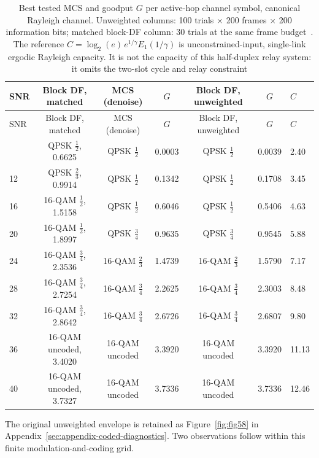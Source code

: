 \begingroup\footnotesize
\begin{longtable}[]{@{}lcccccl@{}}
\caption[Link-adaptation envelope: best MCS per SNR]{Best tested MCS and goodput $G$ per active-hop channel symbol, canonical Rayleigh channel. Unweighted columns: 100 trials $\times$ 200 frames $\times$ 200 information bits; matched block-DF column: 30 trials at the same frame budget~. The reference $C=\log_2(e)\,e^{1/\gamma}E_1(1/\gamma)$ is unconstrained-input, single-link ergodic Rayleigh capacity. It is not the capacity of this half-duplex relay system: it omits the two-slot cycle and relay constraint}\label{tbl:table42}\tabularnewline
\toprule\noalign{}
SNR & Block DF, matched & MCS (denoise) & $G$ & Block DF, unweighted & $G$ & $C$ \\
\midrule\noalign{}
\endfirsthead
\toprule\noalign{}
SNR & Block DF, matched & MCS (denoise) & $G$ & Block DF, unweighted & $G$ & $C$ \\
\midrule\noalign{}
\endhead
\bottomrule\noalign{}
\endlastfoot
8 & QPSK $\frac{1}{2}$, 0.6625 & QPSK $\frac{1}{2}$ & 0.0003 & QPSK $\frac{1}{2}$ & 0.0039 & 2.40 \\
12 & QPSK $\frac{2}{3}$, 0.9914 & QPSK $\frac{1}{2}$ & 0.1342 & QPSK $\frac{1}{2}$ & 0.1708 & 3.45 \\
16 & 16-QAM $\frac{1}{2}$, 1.5158 & QPSK $\frac{1}{2}$ & 0.6046 & QPSK $\frac{1}{2}$ & 0.5406 & 4.63 \\
20 & 16-QAM $\frac{1}{2}$, 1.8997 & QPSK  $\frac{3}{4}$ & 0.9635 & QPSK $\frac{3}{4}$ & 0.9545 & 5.88 \\
24 & 16-QAM $\frac{3}{4}$, 2.3536 & 16-QAM  $\frac{2}{3}$ & 1.4739 & 16-QAM $\frac{2}{3}$ & 1.5790 & 7.17 \\
28 & 16-QAM $\frac{3}{4}$, 2.7254 & 16-QAM $\frac{3}{4}$ & 2.2625 & 16-QAM $\frac{3}{4}$ & 2.3003 & 8.48 \\
32 & 16-QAM $\frac{3}{4}$, 2.8642 & 16-QAM  $\frac{3}{4}$ & 2.6726 & 16-QAM $\frac{3}{4}$ & 2.6807 & 9.80 \\
36 & 16-QAM uncoded, 3.4020 & 16-QAM uncoded & 3.3920 & 16-QAM uncoded & 3.3920 & 11.13 \\
40 & 16-QAM uncoded, 3.7327 & 16-QAM uncoded & 3.7336 & 16-QAM uncoded & 3.7336 & 12.46 \\
\end{longtable}
\endgroup



The original unweighted envelope is retained as Figure~\ref{fig:fig58} in Appendix~\ref{sec:appendix-coded-diagnostics}. Two observations follow within this finite modulation-and-coding grid.

